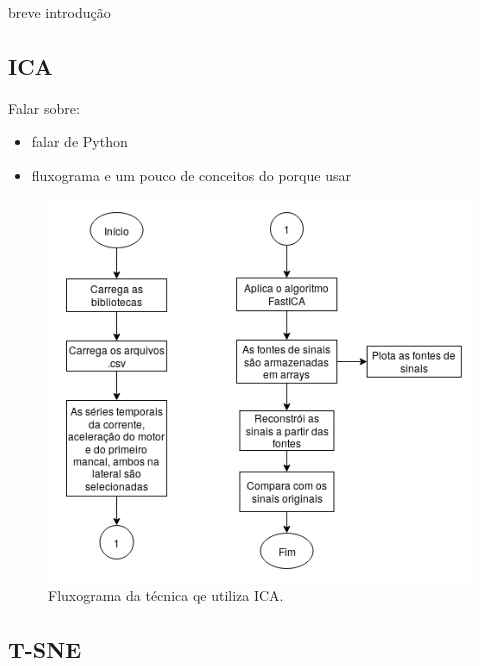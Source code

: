 {breve introdução}

%  

\subsection{ICA}

Falar sobre: 
\begin{itemize}
    \item falar de Python
    \item fluxograma e um pouco de conceitos do porque usar
\end{itemize}

\begin{figure}[H]
    \caption{Fluxograma da técnica qe utiliza ICA.}
    \begin{center}
        \includegraphics[scale=.65]{metodologia/img/ica.png}
    \end{center}
    \label{fig:}
\end{figure}

%  

\subsection{T-SNE}

